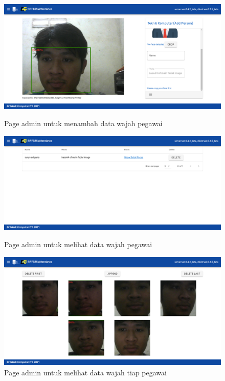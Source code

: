 \begin{figure} [p] \centering
  \includegraphics[scale=0.2]{gambar/addpersonfix.png}
  \caption{Page admin untuk menambah data wajah pegawai}
  \label{fig:SfAddperson}

  \includegraphics[scale=0.2]{gambar/listperson.png}
  \caption{Page admin untuk melihat data wajah pegawai}
  \label{fig:SfListperson}

  \includegraphics[scale=0.2]{gambar/listface.png}
  \caption{Page admin untuk melihat data wajah tiap pegawai}
  \label{fig:SfListperson}
\end{figure}

